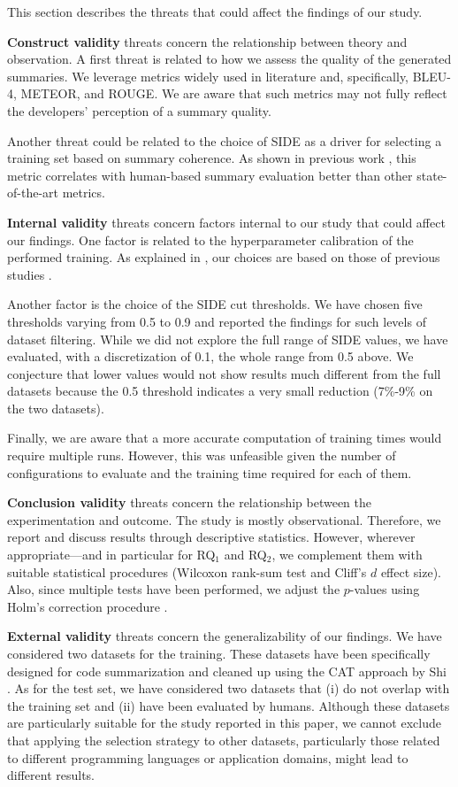 
This section describes the threats that could affect the findings of our study.

\textbf{Construct validity} threats concern the relationship between theory and observation. A first threat is related to how we assess the quality of the generated summaries. We leverage metrics widely used in literature and, specifically, BLEU-4, METEOR, and ROUGE. We are aware that such metrics may not fully reflect the developers' perception of a summary quality.

Another threat could be related to the choice of SIDE as a driver for selecting a training set based on summary coherence. As shown in previous work \cite{mastropaolo2024evaluating}, this metric correlates with human-based summary evaluation better than other state-of-the-art metrics.

\textbf{Internal validity} threats concern factors internal to our study that could affect our findings. One factor is related to the hyperparameter calibration of the performed training. As explained in , our choices are based on those of previous studies \cite{mastropaolo2023towards,ciniselli2024generalizability}.

Another factor is the choice of the SIDE cut thresholds. We have chosen five thresholds varying from 0.5 to 0.9 and reported the findings for such levels of dataset filtering. While we did not explore the full range of SIDE values, we have evaluated, with a discretization of 0.1, the whole range from 0.5 above. We conjecture that lower values would not show results much different from the full datasets because the 0.5 threshold indicates a very small reduction (7\%-9\% on the two datasets).

Finally, we are aware that a more accurate computation of training times would require multiple runs. However, this was unfeasible given the number of configurations to evaluate and the training time required for each of them. 

\textbf{Conclusion validity} threats concern the relationship between the experimentation and outcome. The study is mostly observational. Therefore, we report and discuss results through descriptive statistics. However, wherever appropriate---and in particular for RQ$_1$ and RQ$_2$, we complement them with suitable statistical procedures (Wilcoxon rank-sum test and Cliff's $d$ effect size). Also, since multiple tests have been performed, we adjust the $p$-values using Holm's correction procedure \cite{holm1979simple}.

\textbf{External validity} threats concern the generalizability of our findings. We have considered two datasets for the training. These datasets have been specifically designed for code summarization and cleaned up using the CAT approach by Shi \etal \cite{shi2022we}. 
As for the test set, we have considered two datasets that (i) do not overlap with the training set and (ii) have been evaluated by humans. 
Although these datasets are particularly suitable for the study reported in this paper, we cannot exclude that applying the selection strategy to other datasets, particularly those related to different programming languages or application domains, might lead to different results.

